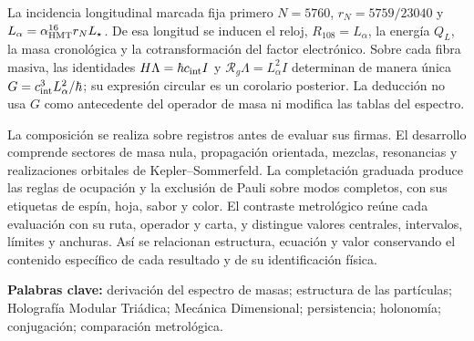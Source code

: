 La incidencia longitudinal marcada fija primero
\(N=5760\), \(r_N=5759/23040\) y
\(L_\alpha=\alpha_{\rm HMT}^{16}r_NL_\star\). De esa longitud se inducen
el reloj, \(R_{108}=L_\alpha\), la energía \(Q_L\), la masa cronológica y
la cotransformación del factor electrónico. Sobre cada fibra masiva, las
identidades \(H\Lambda=\hbar c_{\rm int}I\) y
\(\mathcal R_g\Lambda=L_\alpha^2I\) determinan de manera única
\(G=c_{\rm int}^3L_\alpha^2/\hbar\); su expresión circular es un
corolario posterior. La deducción no usa \(G\) como antecedente del
operador de masa ni modifica las tablas del espectro.

La composición se realiza sobre registros antes de evaluar sus firmas.
El desarrollo comprende sectores de masa nula, propagación orientada,
mezclas, resonancias y realizaciones orbitales de Kepler--Sommerfeld. La
completación graduada produce las reglas de ocupación y la exclusión de
Pauli sobre modos completos, con sus etiquetas de espín, hoja, sabor y
color. El contraste metrológico reúne cada evaluación con su ruta,
operador y carta, y distingue valores centrales, intervalos, límites y
anchuras. Así se relacionan estructura, ecuación y valor conservando el
contenido específico de cada resultado y de su identificación física.

\noindent\textbf{Palabras clave:} derivación del espectro de masas;
estructura de las partículas; Holografía Modular Triádica; Mecánica
Dimensional; persistencia; holonomía; conjugación; comparación metrológica.
\par\endgroup
